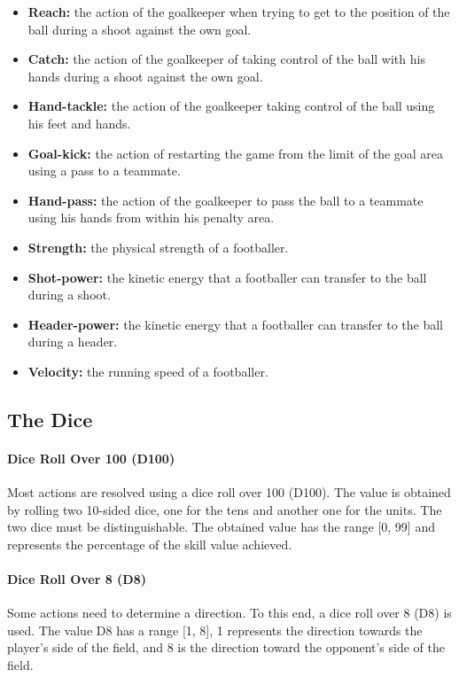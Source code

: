 \documentclass[12pt]{article}
\begin{document}
\begin{itemize}
\item \textbf{Reach:} the action of the goalkeeper when trying to get to the position of the ball during a shoot against the own goal.
\item \textbf{Catch: }the action of the goalkeeper of taking control of the ball with his hands during a shoot against the own goal.
\item \textbf{Hand-tackle: }the action of the goalkeeper taking control of the ball using his feet and hands.
\item \textbf{Goal-kick: }the action of restarting the game from the limit of the goal area using a pass to a teammate.
\item \textbf{Hand-pass: }the action of the goalkeeper to pass the ball to a teammate using his hands from within his penalty area.
\item \textbf{Strength:} the physical strength of a footballer.
\item \textbf{Shot-power: }the kinetic energy that a footballer can transfer to the ball during a shoot.
\item \textbf{Header-power:} the kinetic energy that a footballer can transfer to the ball during a header.
\item \textbf{Velocity:} the running speed of a footballer.
\end{itemize}

\subsection{\textbf{The Dice}}

\paragraph{Dice Roll Over 100 (D100)}

Most actions are resolved using a dice roll over 100 (D100). The value is obtained by rolling two 10-sided dice, one for the tens and another one for the units. The two dice must be distinguishable. The obtained value has the range [0, 99] and represents the percentage of the skill value achieved.

\paragraph{Dice Roll Over 8 (D8)}

Some actions need to determine a direction. To this end, a dice roll over 8 (D8) is used. The value D8 has a range [1, 8], 1 represents the direction towards the player's side of the field, and 8 is the direction toward the opponent's side of the field.
\end{document}
